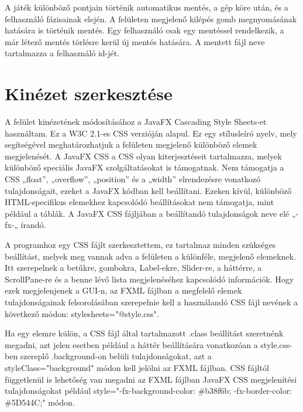 A játék különböző pontjain történik automatikus mentés, a gép köre után, és a felhasználó fázisainak elején. A felületen megjelenő kilépés gomb megnyomásának hatására is történik mentés. Egy felhasználó csak egy mentéssel rendelkezik, a már létező mentés törlésre kerül új mentés hatására. A mentett fájl neve tartalmazza a felhasználó id-jét. 

\section{Kinézet szerkesztése}

A felület kinézetének módosításához a JavaFX Cascading Style Sheets-et használtam. Ez a W3C 2.1-es CSS verzióján alapul. Ez egy stílusleíró nyelv, mely segítségével meghatározhatjuk a felületen megjelenő különböző elemek megjelenését. A JavaFX CSS a CSS olyan kiterjesztéseit tartalmazza, melyek különböző speciális JavaFX szolgáltatásokat is támogatnak. Nem támogatja a CSS „float”, „overflow”, „position” és a „width” elrendezésre vonatkozó tulajdonságait, ezeket a JavaFX kódban kell beállítani. Ezeken kívül, különböző HTML-specifikus elemekhez kapcsolódó beállításokat nem támogatja, mint például a táblák. A JavaFX CSS fájljában a beállítandó tulajdonságok neve elé „-fx-„ írandó. 

A programhoz egy CSS fájlt szerkesztettem, ez tartalmaz minden szükséges beállítást, melyek meg vannak adva a felületen a különféle, megjelenő elemeknek. Itt szerepelnek a betűkre, gombokra, Label-ekre, Slider-re, a háttérre, a ScrollPane-re és a benne lévő lista megjelenéséhez kapcsolódó információk. Hogy ezek megjelenjenek a GUI-n, az FXML fájlban a megfelelő elemek tulajdonságainak felsorolásában szerepelnie kell a használandó CSS fájl nevének a következő módon: stylesheets="@style.css". 

Ha egy elemre külön, a CSS fájl által tartalmazott .class beállítást szeretnénk megadni, azt jelen esetben például a háttér beállítására vonatkozóan a style.css-ben szereplő .background{}-on belüli tulajdonságokat, azt a styleClass="background" módon kell jelölni az FXML fájlban. CSS fájltól függetlenül is lehetőség van megadni az FXML fájlban JavaFX CSS megjelenítési tulajdonságokat például style="-fx-background-color: \#b38f6b; -fx-border-color: \#5D544C;" módon. 
